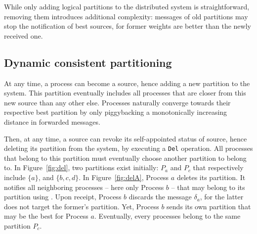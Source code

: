 

 
While only adding logical partitions to the distributed system is
straightforward, removing them introduces additional complexity:
messages of old partitions may stop the notification of best sources,
for former weights are better than the newly received one. 


\subsection{Dynamic consistent partitioning}

At any time, a process can become a source, hence adding a new
partition to the system. This partition eventually includes all
processes that are closer from this new source than any other
else. Processes naturally converge towards their respective best
partition by only piggybacking a monotonically increasing distance in
forwarded messages.

Then, at any time, a source can revoke its self-appointed status of
source, hence deleting its partition from the system, by executing a
\texttt{Del} operation. All processes that belong to this partition
must eventually choose another partition to belong to. In
Figure~\ref{fig:del}, two partitions exist initially: $P_a$ and $P_c$
that respectively include $\{a\}$, and $\{b, c, d\}$. In
Figure~\ref{fig:delA}, Process $a$ deletes its partition. It notifies
all neighboring processes -- here only Process $b$ -- that may belong
to its partition using \NAMEB. Upon receipt, Process $b$ discards the
message $\delta_a$, for the latter does not target the former's
partition. Yet, Process $b$ sends its own partition that may be the
best for Process $a$. Eventually, every processes belong to the same
partition $P_c$.

